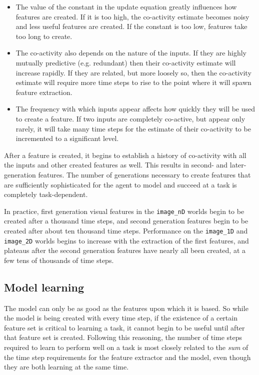 \begin{itemize}
\item The value of the constant in the update equation greatly influences how features are created. If it is too high, the co-activity estimate becomes noisy and less useful features are created. If the constant is too low, features take too long to create. 

\item The co-activity also depends on the nature of the inputs. If they are highly mutually predictive (e.g. redundant) then their co-activity estimate will increase rapidly. If they are related, but more loosely so, then the co-activity estimate will require more time steps to rise to the point where it will spawn feature extraction. 

\item The frequency with which inputs appear affects how quickly they will be used to create a feature. If two inputs are completely co-active, but appear only rarely, it will take many time steps for the estimate of their co-activity to be incremented to a significant level.

\end{itemize}

After a feature is created, it begins to establish a history of co-activity with all the inputs and other created features as well. This results in second- and later-generation features. The number of generations necessary to create features that are sufficiently sophisticated for the agent to model and succeed at a task is completely task-dependent.

In practice, first generation visual features in the \texttt{image\_nD} worlds begin to be created after a thousand time steps, and second generation features begin to be created after about ten thousand time steps. Performance on the \texttt{image\_1D} and  \texttt{image\_2D} worlds begins to increase with the extraction of the first features, and plateaus after the second generation features have nearly all been created, at a few tens of thousands of time steps. 

\subsection{Model learning}

The model can only be as good as the features upon which it is based. So while the model is being created with every time step, if the existence of a certain feature set is critical to learning a task, it cannot begin to be useful until after that feature set is created. Following this reasoning, the number of time steps required to learn to perform well on a task is most closely related to the {\em sum} of the time step requirements for the feature extractor and the model, even though they are both learning at the same time.


